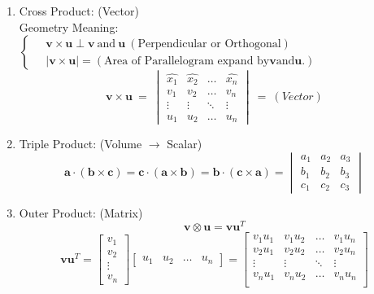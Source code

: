 \documentclass[12px]{article}
\begin{document}
\begin{enumerate}
\begin{enumerate}[(1)]
\begin{enumerate}
\newpage
            \item Cross Product: (Vector)\\
            Geometry Meaning: 
            $\left\{\begin{aligned}
                &\ \textbf{v}\times\textbf{u}\perp\textbf{v}\ \text{and}\ \textbf{u}\ (\text{Perpendicular or Orthogonal})\\
                &\ |\textbf{v}\times\textbf{u}|=(\text{Area of Parallelogram expand by} \textbf{v} \text{and} \textbf{u}.)
            \end{aligned}\right.$
            $$\textbf{v}\times\textbf{u}\ =\ \begin{vmatrix}
                \hat{x_1} &\hat{x_2} &\hdots &\hat{x_n}\\
                v_1 &v_2 &\hdots &v_n\\
                \vdots &\vdots &\ddots &\vdots\\
                u_1 &u_2 &\hdots &u_n\end{vmatrix}\ =\ (Vector)$$
            \item Triple Product: (Volume $\rightarrow$ Scalar)\\
            $$\textbf{a}\cdot(\textbf{b}\times\textbf{c})=\textbf{c}\cdot(\textbf{a}\times\textbf{b})=\textbf{b}\cdot(\textbf{c}\times\textbf{a})=\begin{vmatrix}
                a_1&a_2&a_3\\
                b_1&b_2&b_3\\
                c_1&c_2&c_3
            \end{vmatrix}$$
            \item Outer Product: (Matrix)
            $$\textbf{v}\otimes\textbf{u}=\textbf{v}\textbf{u}^T$$
            $$\textbf{v}\textbf{u}^T=\begin{bmatrix}v_1\\v_2\\ \vdots\\v_n\end{bmatrix}
            \begin{bmatrix}u_1 &u_2 &\dots &u_n\end{bmatrix}=
            \begin{bmatrix}
                v_1u_1 &v_1u_2 &\hdots &v_1u_n\\
                v_2u_1 &v_2u_2 &\hdots &v_2u_n\\
                \vdots &\vdots &\ddots &\vdots\\
                v_nu_1 &v_nu_2 &\hdots &v_nu_n\\

\end{bmatrix}$$
\end{enumerate}
\end{enumerate}
\end{enumerate}
\end{document}
